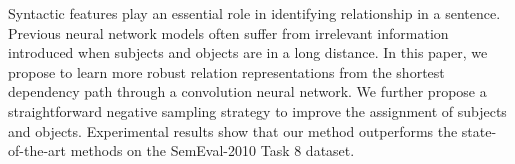 Syntactic features play an essential role in identifying relationship in a sentence. Previous neural network models often suffer from irrelevant information introduced when subjects and objects are in a long distance. In this paper, we propose to learn more robust relation representations from the shortest dependency path through a convolution neural network. We further propose a straightforward negative sampling strategy to improve the assignment of subjects and objects. Experimental results show that our method outperforms the state-of-the-art methods on the SemEval-2010 Task 8 dataset.

